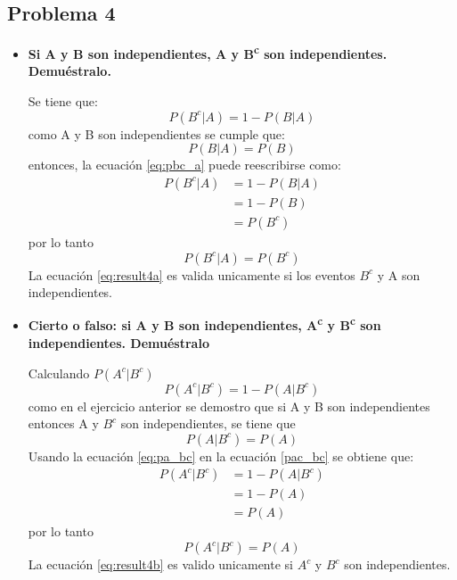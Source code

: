 \subsection*{Problema 4}
\begin{itemize}
    \item \textbf{Si A y B son independientes, A y B\textsuperscript{c} son independientes. Demuéstralo.}

          Se tiene que:
          \begin{equation}
              P(B^c|A)  =1-P(B|A)
              \label{eq:pbc_a}
          \end{equation}
          como A y B son independientes se cumple que:
          \begin{equation*}
              P(B|A)= P(B)
          \end{equation*}
          entonces, la ecuación \ref{eq:pbc_a} puede reescribirse como:
          \begin{align*}
              P(B^c|A) & =1-P(B|A) \\
                       & = 1- P(B) \\
                       & = P(B^c)
          \end{align*}
          por lo tanto
          \begin{equation}
              P(B^c|A) = P(B^c)
              \label{eq:result4a}
          \end{equation}
          La ecuación \ref{eq:result4a} es valida unicamente si los eventos $B^c$ y A son independientes.
    \item \textbf{Cierto o falso: si A y B son independientes, A\textsuperscript{c} y B\textsuperscript{c} son independientes. Demuéstralo}

          Calculando $P(A^c|B^c)$
          \begin{equation}
              P(A^c|B^c) = 1-P(A|B^c)
              \label{pac_bc}
          \end{equation}
          como en el ejercicio anterior se demostro que si A y B son independientes entonces A y $B^c$ son independientes, se tiene que
          \begin{equation}
              P(A|B^c) = P(A)
              \label{eq:pa_bc}
          \end{equation}
          Usando la ecuación \ref{eq:pa_bc} en la ecuación \ref{pac_bc} se obtiene que:
          \begin{align*}
              P(A^c|B^c) & = 1-P(A|B^c) \\
                         & = 1-P(A)     \\
                         & =P(A)
          \end{align*}
          por lo tanto
          \begin{equation}
              P(A^c|B^c)=P(A)
              \label{eq:result4b}
          \end{equation}
          La ecuación \ref{eq:result4b} es valido unicamente si $A^c$ y $B^c$ son independientes.
\end{itemize}
